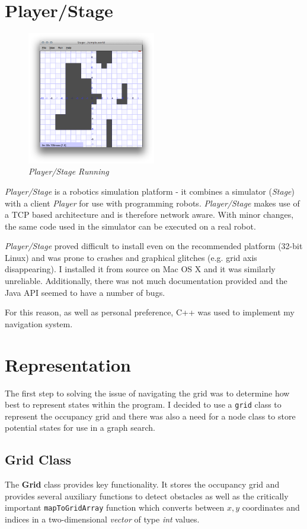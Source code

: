 \documentclass[a4paper,12pt]{article}
\begin{document}
\section{Player/Stage}
\begin{figure}
    \begin{center}
            \includegraphics[width=0.5\textwidth]{images/Start_GUI.png}
            \caption{\textit{Player/Stage Running}}
    \end{center}
\end{figure}
\textit{Player/Stage} is a robotics simulation platform - it combines a simulator (\textit{Stage}) with a client \textit{Player} for use with programming robots. \textit{Player/Stage} makes use of a TCP based architecture \cite{pstcp} and is therefore network aware. With minor changes, the same code used in the simulator can be executed on a real robot.

\textit{Player/Stage} proved difficult to install even on the recommended platform (32-bit Linux) and was prone to crashes and graphical glitches (e.g. grid axis disappearing). I installed it from source on Mac OS X and it was similarly unreliable. Additionally, there was not much documentation provided and the Java API seemed to have a number of bugs. 

For this reason, as well as personal preference, C++ was used to implement my navigation system.
\section{Representation}
The first step to solving the issue of navigating the grid was to determine how best to represent states within the program. I decided to use a \texttt{grid} class to represent the occupancy grid and there was also a need for a node class to store potential states for use in a graph search. 
\subsection{Grid Class}
The \textbf{Grid} class provides key functionality. It stores the occupancy grid and provides several auxiliary functions to detect obstacles as well as the critically important \texttt{mapToGridArray} function which converts between $x,y$ coordinates and indices in a two-dimensional \textit{vector} of type \textit{int} values. 
\end{document}

